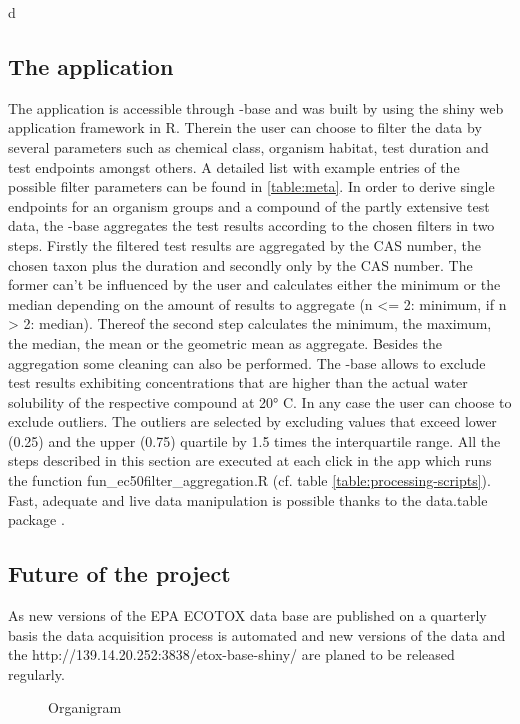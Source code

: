 d\documentclass[english]{article}
\newcommand{\epa}{EPA ECOTOX data base}
\newcommand{\app}{http://139.14.20.252:3838/etox-base-shiny/}
\begin{document}
\subsection*{The application}
The application is accessible through \etox-base{} and was built by using the shiny web application framework \citep{chang_shiny_2018} in R. Therein the user can choose to filter the data by several parameters such as chemical class, organism habitat, test duration and test endpoints amongst others. A detailed list with example entries of the possible filter parameters can be found in \ref{table:meta}. In order to derive single endpoints for an organism groups and a compound of the partly extensive test data, the \etox-base{} aggregates the test results according to the chosen filters in two steps. Firstly the filtered test results are aggregated by the CAS number, the chosen taxon plus the duration and secondly only by the CAS number. The former can't be influenced by the user and calculates either the minimum or the median depending on the amount of results to aggregate (n <= 2: minimum, if n > 2: median). Thereof the second step calculates the minimum, the maximum, the median, the mean or the geometric mean as aggregate. Besides the aggregation some cleaning can also be performed. The \etox-base{} allows to exclude test results exhibiting concentrations that are higher than the actual water solubility of the respective compound at \ang{20} C. In any case the user can choose to exclude outliers. The outliers are selected by excluding values that exceed lower (0.25) and the upper (0.75) quartile by 1.5 times the interquartile range. All the steps described in this section are executed at each click in the app which runs the function fun\_ec50filter\_aggregation.R (cf. table \ref{table:processing-scripts}). Fast, adequate and live data manipulation is possible thanks to the data.table package \citep{dowle_data.table_2018}.

\subsection*{Future of the project}
As new versions of the \epa{} are published on a quarterly basis the data acquisition process is automated and new versions of the data and the \app{} are planed to be released regularly.

\begin{figure}
    
    \caption{Organigram}
    \label{fig:organigram}
\end{figure}
\end{document}
